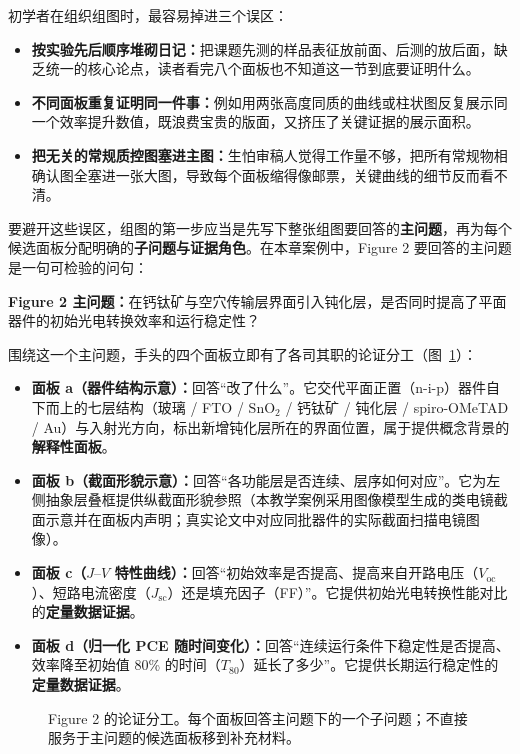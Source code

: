 初学者在组织组图时，最容易掉进三个误区：
\begin{itemize}
\item \textbf{按实验先后顺序堆砌日记：}把课题先测的样品表征放前面、后测的放后面，缺乏统一的核心论点，读者看完八个面板也不知道这一节到底要证明什么。
\item \textbf{不同面板重复证明同一件事：}例如用两张高度同质的曲线或柱状图反复展示同一个效率提升数值，既浪费宝贵的版面，又挤压了关键证据的展示面积。
\item \textbf{把无关的常规质控图塞进主图：}生怕审稿人觉得工作量不够，把所有常规物相确认图全塞进一张大图，导致每个面板缩得像邮票，关键曲线的细节反而看不清。
\end{itemize}

要避开这些误区，组图的第一步应当是先写下整张组图要回答的\textbf{主问题}，再为每个候选面板分配明确的\textbf{子问题与证据角色}。在本章案例中，Figure 2 要回答的主问题是一句可检验的问句：

\begin{BookNote}
\textbf{Figure 2 主问题：}在钙钛矿与空穴传输层界面引入钝化层，是否同时提高了平面器件的初始光电转换效率和运行稳定性？
\end{BookNote}

围绕这一个主问题，手头的四个面板立即有了各司其职的论证分工（图~\ref{fig:ch09-01}）：
\begin{itemize}
\item \textbf{面板 a（器件结构示意）：}回答“改了什么”。它交代平面正置（n-i-p）器件自下而上的七层结构（玻璃 / FTO / $\text{SnO}_2$ / 钙钛矿 / 钝化层 / spiro-OMeTAD / Au）与入射光方向，标出新增钝化层所在的界面位置，属于提供概念背景的\textbf{解释性面板}。
\item \textbf{面板 b（截面形貌示意）：}回答“各功能层是否连续、层序如何对应”。它为左侧抽象层叠框提供纵截面形貌参照（本教学案例采用图像模型生成的类电镜截面示意并在面板内声明；真实论文中对应同批器件的实际截面扫描电镜图像）。
\item \textbf{面板 c（$J\text{--}V$ 特性曲线）：}回答“初始效率是否提高、提高来自开路电压（$V_{\text{oc}}$）、短路电流密度（$J_{\text{sc}}$）还是填充因子（FF）”。它提供初始光电转换性能对比的\textbf{定量数据证据}。
\item \textbf{面板 d（归一化 PCE 随时间变化）：}回答“连续运行条件下稳定性是否提高、效率降至初始值 80\% 的时间（$T_{80}$）延长了多少”。它提供长期运行稳定性的\textbf{定量数据证据}。
\end{itemize}

\begin{figure}[htbp]\centering
\resizebox{\linewidth}{!}{}
\caption{Figure 2 的论证分工。每个面板回答主问题下的一个子问题；不直接服务于主问题的候选面板移到补充材料。}\label{fig:ch09-01}
\end{figure}

